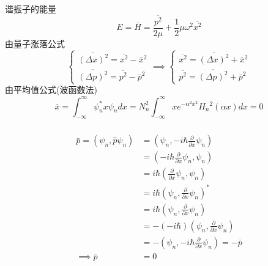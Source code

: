 \begin{frame}
  \frametitle{}
  \证 谐振子的能量
  $$
  E=\overline{H}=\frac{\overline{p^2}}{2 \mu}+\frac{1}{2} \mu \omega^2 \overline{x^2}
  $$
  由量子涨落公式
  $$
\left\{\begin{array}{l}
\overline{(\Delta x)^2}=\overline{x^2}-\bar{x}^2 \\
\overline{(\Delta p)^2}=\overline{p^2}-\bar{p}^2
\end{array}\right. \implies \left\{\begin{array}{l}
    \overline{x^2}=\overline{(\Delta x)^2}+\bar{x}^2 \\
    \overline{p^2}=\overline{(\Delta p)^2}+\bar{p}^2
    \end{array}\right.
$$
由平均值公式(波函数法)
$$
\bar{x}=\int_{-\infty}^{\infty} \psi_n^*  x \psi_n d x=N_n^2 \int_{-\infty}^{\infty} x e^{-\alpha^2 x^2} H_n{ }^2(\alpha x) d x=0
$$
\end{frame} 


\begin{frame}
  \frametitle{}
  $$
  \begin{aligned}
  \bar{p}  = (\psi_n, \hat{p} \psi_n) 
  &=\left(\psi_n, -i \hbar \frac{\partial}{\partial x} \psi_n\right) \\
  & =\left(-i \hbar \frac{\partial}{\partial x} \psi _n, \psi_n\right) \\
  & =i \hbar\left( \frac{\partial}{\partial x} \psi _n, \psi_n\right) \\
  & =i \hbar\left(\psi_n, \frac{\partial}{\partial x} \psi _n\right)^* \\ 
  &= i \hbar\left(\psi_n, \frac{\partial}{\partial x} \psi _n\right)\\ 
  &= -(-i \hbar)\left(\psi_n, \frac{\partial}{\partial x} \psi _n\right)\\ 
  &=-\left(\psi_n, -i \hbar\frac{\partial}{\partial x} \psi _n\right) =-\bar{p} \\
  \implies \bar{p} &= 0 
  \end{aligned}
  $$
\end{frame} 

